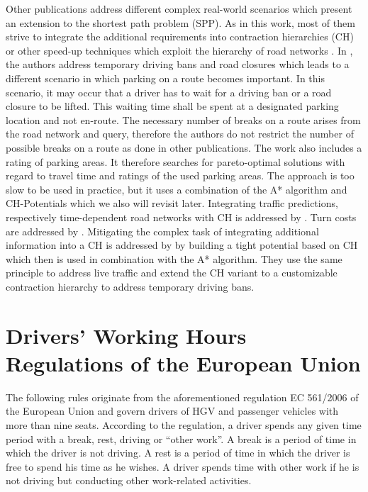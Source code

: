 Other publications address different complex real-world scenarios which present an extension to the shortest path problem (SPP). As in this work, most of them strive to integrate the additional requirements into contraction hierarchies (CH) or other speed-up techniques which exploit the hierarchy of road networks \cite{bast:2016}. In \cite{kleff:2020b}, the authors address temporary driving bans and road closures which leads to a different scenario in which parking on a route becomes important. In this scenario, it may occur that a driver has to wait for a driving ban or a road closure to be lifted. This waiting time shall be spent at a designated parking location and not en-route. The necessary number of breaks on a route arises from the road network and query, therefore the authors do not restrict the number of possible breaks on a route as done in other publications. The work also includes a rating of parking areas. It therefore searches for pareto-optimal solutions with regard to travel time and ratings of the used parking areas. The approach is too slow to be used in practice, but it uses a combination of the A* algorithm and CH-Potentials which we also will revisit later. Integrating traffic predictions, respectively time-dependent road networks with CH is addressed by \cite{batz:2010,batz:2013}. Turn costs are addressed by \cite{geisberger:2011}. Mitigating the complex task of integrating additional information into a CH is addressed by \cite{strasser:2021b} by building a tight potential based on CH which then is used in combination with the A* algorithm. They use the same principle to address live traffic and extend the CH variant to a customizable contraction hierarchy \cite{dibbelt:2016} to address temporary driving bans.


\section{Drivers' Working Hours Regulations of the European Union\label{sec:dwh_eu}}
The following rules originate from the aforementioned regulation EC 561/2006 of the European Union \cite{europeanparliament:2006} and govern drivers of HGV and passenger vehicles with more than nine seats. According to the regulation, a driver spends any given time period with a break, rest, driving or ``other work''. A break is a period of time in which the driver is not driving. A rest is a period of time in which the driver is free to spend his time as he wishes. A driver spends time with other work if he is not driving but conducting other work-related activities.

